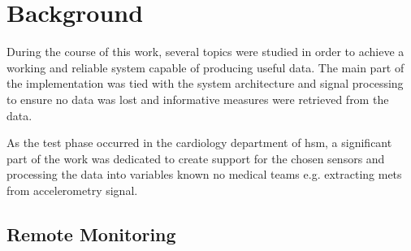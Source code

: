 
\chapter{Background}
\label{chapter:background}


During the course of this work, several topics were studied in order to achieve a working and reliable system capable of producing useful data. The main part of the implementation was tied with the system architecture and signal processing to ensure no data was lost and informative measures were retrieved from the data.

As the test phase occurred in the cardiology department of \ac{hsm}, a significant part of the work was dedicated to create support for the chosen sensors and processing the data into variables known no medical teams e.g. extracting \ac{mets} \cite{crouter_METS} from accelerometry signal.

%

\section{Remote Monitoring}


